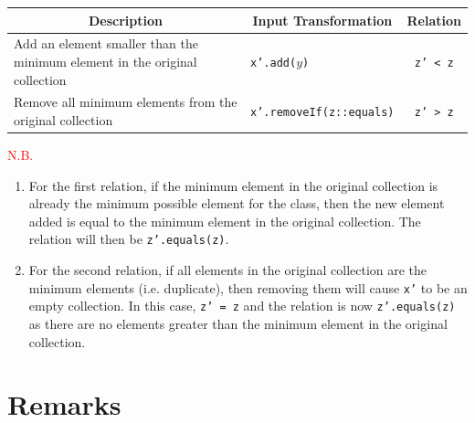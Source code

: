 \documentclass[12pt, a4paper]{article}
\begin{document}
\begin{table}[H]
  \centering
  \begin{tabular}{p{7.2cm}|l|c}
  \hline
  \multicolumn{1}{c|}{\textbf{Description}} & \multicolumn{1}{c|}{\textbf{Input Transformation}} &
  \textbf{Relation} \\ \hline
  Add an element smaller than the minimum element in the original collection & \texttt{x'.add($y$)}
  & \texttt{z' < z} \\ \hline
  Remove all minimum elements from the original collection & \texttt{x'.removeIf(z::equals)}
  & \texttt{z' > z} \\ \hline
  \hline
  \end{tabular}
\end{table}

\newpage\noindent\textcolor{red}{N.B.}
\begin{enumerate}
  \item For the first relation, if the minimum element in the original collection is already the
  minimum possible element for the class, then the new element added is equal to the minimum element
  in the original collection. The relation will then be \texttt{z'.equals(z)}.
  \item For the second relation, if all elements in the original collection are the minimum elements
  (i.e. duplicate), then removing them will cause \texttt{x'} to be an empty collection. In this
  case, \texttt{z' = z} and the relation is now \texttt{z'.equals(z)} as there are no elements
  greater than the minimum element in the original collection.
\end{enumerate}

\section{Remarks}


\printbibliography
\end{document}
